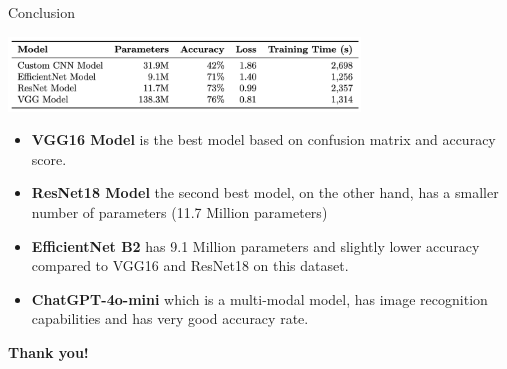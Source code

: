 \documentclass{beamer}
\begin{document}
\begin{frame}{Conclusion}
    \begin{center}
    \includegraphics[width=0.7\textwidth]{conclusion.png}
    \end{center}
    \begin{itemize}
        \item \textbf{VGG16 Model} is the best model based on confusion matrix and accuracy score.
        \item \textbf{ResNet18 Model} the second best model, on the other hand, has a smaller number of parameters (11.7 Million parameters)
        \item \textbf{EfficientNet B2} has 9.1 Million parameters and slightly lower accuracy compared to VGG16 and ResNet18 on this dataset.
        \item \textbf{ChatGPT-4o-mini} which is a multi-modal model, has image recognition capabilities and has very good accuracy rate.
    \end{itemize}
    
    \vspace{0.5cm}
    \begin{center}
        \textbf{\textcolor{maincolor}{Thank you!}}
    \end{center}
\end{frame}
\end{document}
